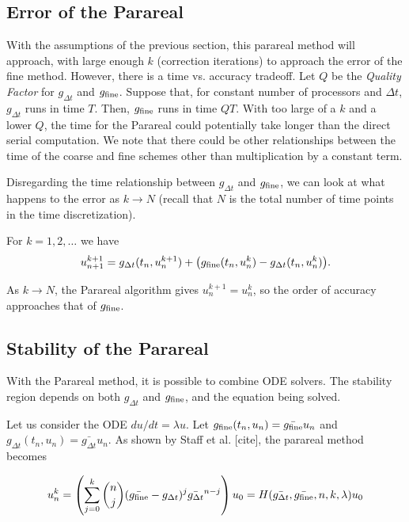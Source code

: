 \documentclass[letterpaper,12pt]{article}
\begin{document}
\subsection{Error of the Parareal}

With the assumptions of the previous section, this parareal method will
approach, with large enough $k$ (correction iterations) to approach the error of
the fine method. However, there is a time vs. accuracy tradeoff. Let $Q$ be the
\emph{Quality Factor} for $g_{\Delta t}$ and $g_{\textnormal{fine}}$. Suppose
that, for constant number of processors and $\Delta t$, $g_{\Delta t}$ runs in
time $T$. Then, $g_{\textnormal{fine}}$ runs in time $QT$. With too large of a
$k$ and a lower $Q$, the time for the Parareal could potentially take longer
than the direct serial computation. We note that there could be other
relationships between the time of the coarse and fine schemes other than
multiplication by a constant term. 

Disregarding the time relationship between $g_{\Delta t}$ and
$g_{\textnormal{fine}}$, we can look at what happens to the error as $k \to N$
(recall that $N$ is the total number of time points in the time discretization). 

For $k = 1, 2, \ldots$ we have 
\[u_{n+1}^{k+1} = g_{\Delta t} (t_n, u_n^{k+1}) + \big(
g_{\textnormal{fine}}(t_n, u_n^k) - g_{\Delta t}(t_n, u_n^k)\big). \]

As $k \to N$, the Parareal algorithm gives $u_{n}^{k+1} = u^k_n$, so the order
of accuracy approaches that of $g_{\textnormal{fine}}$. 


\subsection{Stability of the Parareal}

With the Parareal method, it is possible to combine ODE solvers. The stability region depends on both $g_{\Delta t}$ and $g_{\textnormal{fine}}$, and the
equation being solved. 

Let us consider the ODE $du/dt = \lambda u$. Let $g_{\textnormal{fine}}(t_n,
u_n) = \bar{g_{\textnormal{fine}}}u_n$ and $g_{\Delta t}(t_n, u_n) =
\bar{g_{\Delta t}} u_n$. As shown by Staff et al. [cite], the parareal method
becomes

\[ u_n^k = \left( \sum_{j=0}^k {n \choose j} (\bar{g_{\textnormal{fine}}} -
g_{\Delta t})^j \bar{g_{\Delta t}}^{n-j} \right) u_0 = H(\bar{g_{\Delta
t}}, \bar{g_{\textnormal{fine}}}, n, k, \lambda)u_0 \]
\end{document}
